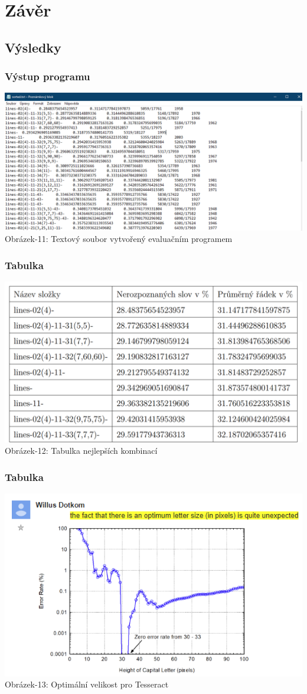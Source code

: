 \documentclass{beamer}
\begin{document}
\section{Závěr}
\subsection{Výsledky}
\begin{frame}
\frametitle{Výstup programu}
\centering
\includegraphics[width=1.1\textwidth]{img/vysledky.png}\\
Obrázek-11: Textový soubor vytvořený evaluačním programem
\end{frame}
\begin{frame}
\frametitle{Tabulka}
\centering
\includegraphics[width=1\textwidth]{img/vysledky-tabulka.png}\\
Obrázek-12: Tabulka nejlepších kombinací
\end{frame}
\begin{frame}
\frametitle{Tabulka}
\centering
\includegraphics[width=1\textwidth]{img/dotkom.png}\\
Obrázek-13: Optimální velikost pro Tesseract 
\end{frame}
\end{document}

